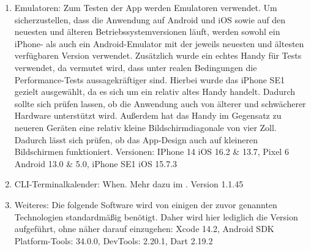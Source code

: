 \begin{enumerate}
	\item Emulatoren: %
		Zum Testen der App werden Emulatoren verwendet. Um sicherzustellen, dass die Anwendung auf Android und iOS sowie auf den neuesten und älteren Betriebssystemversionen läuft, werden sowohl ein iPhone- als auch ein Android-Emulator mit der jeweils neuesten und ältesten verfügbaren Version verwendet. %
		Zusätzlich wurde ein echtes Handy für Tests verwendet, da vermutet wird, dass unter realen Bedingungen die Performance-Tests aussagekräftiger sind. Hierbei wurde das iPhone SE1 gezielt ausgewählt, da es sich um ein relativ altes Handy handelt. %
			Dadurch sollte sich prüfen lassen, ob die Anwendung auch von älterer und schwächerer Hardware unterstützt wird. %
			Außerdem hat das Handy im Gegensatz zu neueren Geräten eine relativ kleine Bildschirmdiagonale von vier Zoll. Dadurch lässt sich prüfen, ob das App-Design auch auf kleineren Bildschirmen funktioniert. %
		Versionen: IPhone 14 iOS 16.2 \& 13.7, Pixel 6 Android 13.0 \& 5.0, iPhone SE1 iOS 15.7.3%
		
	\item CLI-Terminalkalender: When. Mehr dazu im . Version 1.1.45
		
	\item Weiteres: Die folgende Software wird von einigen der zuvor genannten Technologien standardmäßig benötigt. Daher wird hier lediglich die Version aufgeführt, ohne näher darauf einzugehen: Xcode 14.2, Android SDK Platform-Tools: 34.0.0, DevTools: 2.20.1, Dart 2.19.2%
\end{enumerate}

